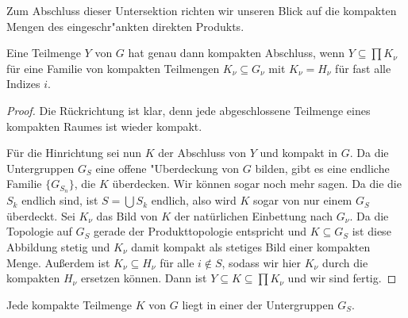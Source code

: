 		Zum Abschluss dieser Untersektion richten wir unseren Blick auf die kompakten Mengen des eingeschr"ankten direkten Produkts.
		\begin{satz}%
			Eine Teilmenge $Y$ von $G$ hat genau dann kompakten Abschluss, wenn $Y \subseteq \prod{K_\nu}$ für eine Familie von kompakten Teilmengen $K_\nu \subseteq G_\nu$ mit $K_\nu = H_\nu$ für fast alle Indizes $i$.
		\end{satz}
		\begin{proof}
			Die Rückrichtung ist klar, denn jede abgeschlossene Teilmenge eines kompakten Raumes ist wieder kompakt. 

			Für die Hinrichtung sei nun $K$ der Abschluss von $Y$ und kompakt in $G$. 
			Da die Untergruppen $G_S$ eine offene "Uberdeckung von $G$ bilden, gibt es eine endliche Familie $\{G_{S_n}\}$, die $K$ überdecken. 
			Wir können sogar noch mehr sagen. 
			Da die die $S_k$ endlich sind, ist $S = \bigcup S_k$ endlich, also wird $K$ sogar von nur einem $G_S$ überdeckt. 
			Sei $K_\nu$ das Bild von $K$ der natürlichen Einbettung nach $G_\nu$. 
			Da die Topologie auf $G_S$ gerade der Produkttopologie entspricht und $K\subseteq G_S$ ist diese Abbildung stetig und $K_\nu$ damit kompakt als stetiges Bild einer kompakten Menge. 
			Außerdem ist $K_\nu \subseteq H_\nu$ für alle $i\notin S$, sodass wir hier $K_\nu$ durch die kompakten $H_\nu$ ersetzen können. 
			Dann ist $Y\subseteq K \subseteq \prod{K_\nu}$ und wir sind fertig.
		\end{proof}
		\begin{korollar}
			Jede kompakte Teilmenge $K$ von $G$ liegt in einer der Untergruppen $G_S$.
		\end{korollar}
 
